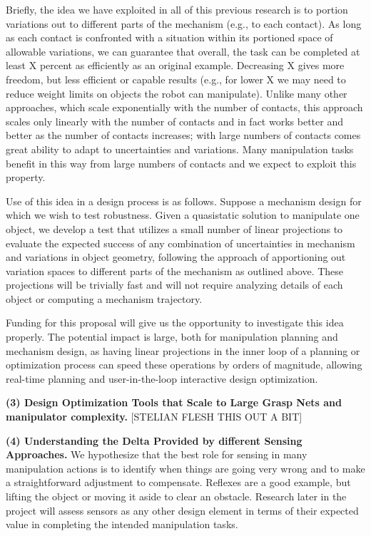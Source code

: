 Briefly, the idea we have exploited in all of this previous research is to portion variations out to different parts of the mechanism (e.g., to each contact).   As long as each contact is confronted with a situation within its portioned space of allowable variations, we can guarantee that overall, the task can be completed at least X percent as efficiently as an original example.   Decreasing X gives more freedom, but less efficient or capable results (e.g., for lower X we may need to reduce weight limits on objects the robot can manipulate).   Unlike many other approaches, which scale exponentially with the number of contacts, this approach scales only linearly with the number of contacts and in fact works better and better as the number of contacts increases; with large numbers of contacts comes great ability to adapt to uncertainties and variations.   Many manipulation tasks benefit in this way from large numbers of contacts and we expect to exploit this property.

Use of this idea in a design process is as follows.   Suppose a mechanism design for which we wish to test robustness.    Given a quasistatic  solution to manipulate one object, we develop a test that utilizes a small number of linear projections to evaluate the expected success of any combination of uncertainties in mechanism and variations in object geometry, following the approach of apportioning out variation spaces to different parts of the mechanism as outlined above.   These projections will be trivially fast and will not require analyzing details of each object or computing a mechanism trajectory.

Funding for this proposal will give us the opportunity to investigate this idea properly.   The potential impact is large, both for manipulation planning and mechanism design, as having linear projections in the inner loop of a planning or optimization process can speed these operations by orders of magnitude, allowing real-time planning and user-in-the-loop interactive design optimization.

\smallskip\noindent
{\bf (3) Design Optimization Tools that Scale to Large Grasp Nets and manipulator complexity.}   [STELIAN FLESH THIS OUT A BIT]

 \smallskip\noindent
{\bf (4) Understanding the Delta Provided by different Sensing Approaches.}  We hypothesize that the best role for sensing in many manipulation actions is to identify when things are going very wrong and to make a straightforward adjustment to compensate.   Reflexes are a good example, but lifting the object or moving it aside to clear an obstacle.   Research later in the project will assess sensors as any other design element in terms of their expected value in completing the intended manipulation tasks.


